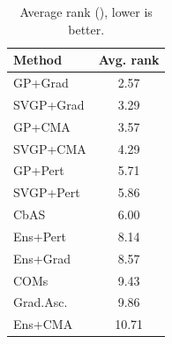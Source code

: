 \begin{table}[t]\centering
\caption{Average rank (), lower is better.}
\label{tab:grid_full_rank}
\begin{tabular}{lc}
\toprule
Method & Avg. rank \\
\midrule
GP+Grad & 2.57 \\
SVGP+Grad & 3.29 \\
GP+CMA & 3.57 \\
SVGP+CMA & 4.29 \\
GP+Pert & 5.71 \\
SVGP+Pert & 5.86 \\
CbAS & 6.00 \\
Ens+Pert & 8.14 \\
Ens+Grad & 8.57 \\
COMs & 9.43 \\
Grad.Asc. & 9.86 \\
Ens+CMA & 10.71 \\
\bottomrule
\end{tabular}
\end{table}